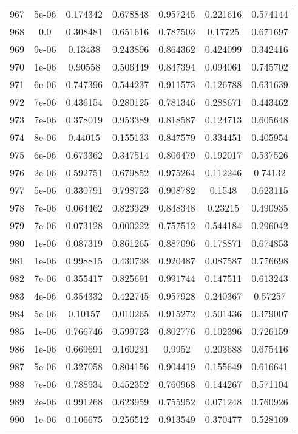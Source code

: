 \begin{table}
\begin{tabular*}{\linewidth}{c|c|c|c|c|c|c}
967 & 5e-06 & 0.174342 & 0.678848 & 0.957245 & 0.221616 & 0.574144\\
968 & 0.0 & 0.308481 & 0.651616 & 0.787503 & 0.17725 & 0.671697\\
969 & 9e-06 & 0.13438 & 0.243896 & 0.864362 & 0.424099 & 0.342416\\
970 & 1e-06 & 0.90558 & 0.506449 & 0.847394 & 0.094061 & 0.745702\\
971 & 6e-06 & 0.747396 & 0.544237 & 0.911573 & 0.126788 & 0.631639\\
972 & 7e-06 & 0.436154 & 0.280125 & 0.781346 & 0.288671 & 0.443462\\
973 & 7e-06 & 0.378019 & 0.953389 & 0.818587 & 0.124713 & 0.605648\\
974 & 8e-06 & 0.44015 & 0.155133 & 0.847579 & 0.334451 & 0.405954\\
975 & 6e-06 & 0.673362 & 0.347514 & 0.806479 & 0.192017 & 0.537526\\
976 & 2e-06 & 0.592751 & 0.679852 & 0.975264 & 0.112246 & 0.74132\\
977 & 5e-06 & 0.330791 & 0.798723 & 0.908782 & 0.1548 & 0.623115\\
978 & 7e-06 & 0.064462 & 0.823329 & 0.848348 & 0.23215 & 0.490935\\
979 & 7e-06 & 0.073128 & 0.000222 & 0.757512 & 0.544184 & 0.296042\\
980 & 1e-06 & 0.087319 & 0.861265 & 0.887096 & 0.178871 & 0.674853\\
981 & 1e-06 & 0.998815 & 0.430738 & 0.920487 & 0.087587 & 0.776698\\
982 & 7e-06 & 0.355417 & 0.825691 & 0.991744 & 0.147511 & 0.613243\\
983 & 4e-06 & 0.354332 & 0.422745 & 0.957928 & 0.240367 & 0.57257\\
984 & 5e-06 & 0.10157 & 0.010265 & 0.915272 & 0.501436 & 0.379007\\
985 & 1e-06 & 0.766746 & 0.599723 & 0.802776 & 0.102396 & 0.726159\\
986 & 1e-06 & 0.669691 & 0.160231 & 0.9952 & 0.203688 & 0.675416\\
987 & 5e-06 & 0.327058 & 0.804156 & 0.904419 & 0.155649 & 0.616641\\
988 & 7e-06 & 0.788934 & 0.452352 & 0.760968 & 0.144267 & 0.571104\\
989 & 2e-06 & 0.991268 & 0.623959 & 0.755952 & 0.071248 & 0.760926\\
990 & 1e-06 & 0.106675 & 0.256512 & 0.913549 & 0.370477 & 0.528169\\
\end{tabular*}
\end{table}
